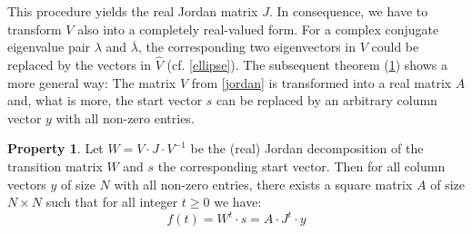 \documentclass[twoside,11pt]{article}
\theoremstyle{definition}
\newtheorem{prop}{Property}
\begin{document}
This procedure yields the real Jordan matrix $J$. In consequence, we have to
transform $V$ also into a completely real-valued form. For a complex
conjugate eigenvalue pair $\lambda$ and $\overline{\lambda}$, the corresponding
two eigenvectors in $V$ could be replaced by the vectors in $\hat{V}$ (cf.
\cref{ellipse}). The subsequent theorem (\cref{chad}) shows a more general way: The
matrix $V$ from \cref{jordan} is transformed into a real matrix $A$
and, what is more, the start vector $s$ can be replaced by an arbitrary column
vector $y$ with all non-zero entries.

\begin{prop}\label{chad}
Let $W = V \cdot J \cdot V^{-1}$ be the (real) Jordan decomposition of the
transition matrix $W$ and $s$ the corresponding start vector. Then for all
column vectors $y$ of size $N$ with all non-zero entries, there exists a square
matrix $A$ of size $N \times N$ such that for all integer $t \ge 0$ we have: \[
f(t) = W^t \cdot s = A \cdot J^t \cdot y \]
\end{prop}
\end{document}

